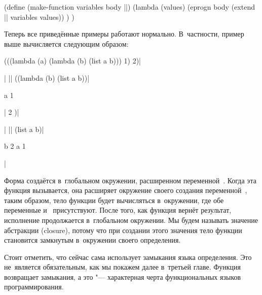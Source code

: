 \begin{code:lisp}[label=basics/representing-functions/fixing/src:inject-current-env]
(define (make-function variables body ||)
  (lambda (values)
    (eprogn body (extend || variables values)) ) )
\end{code:lisp}

Теперь все приведённые примеры работают нормально. В~частности, пример выше
вычисляется следующим образом:

\begin{code:lisp}
(((lambda (a) (lambda (b) (list a b))) 1) 2)|\begin{where}
                                             \- 
                                             \end{where}|
|\equals| ((lambda (b) (list a b))|\begin{where}
                                   \- a {\is} 1
                                   \- 
                                   \end{where}|
    2 )|\begin{where}
        \- 
        \end{where}|
|\equals| (list a b)|\begin{where}
                     \- b {\is} 2
                     \- a {\is} 1
                     \- 
                     \end{where}|
\end{code:lisp}

Форма  создаётся в~глобальном окружении, расширенном
переменной~. Когда эта функция вызывается, она расширяет окружение своего 
создания переменной~, таким образом, тело функции будет вычисляться
в~окружении, где обе переменные  и~ присутствуют. После того, как
функция вернёт результат, исполнение продолжается в~глобальном окружении. Мы
будем называть значение абстракции  (closure), потому что при
создании этого значения тело функции становится замкнутым в~окружении своего
определения.

Стоит отметить, что сейчас  сама использует замыкания языка
определения. Это не~является обязательным, как мы покажем далее в~третьей главе.
 Функция~ возвращает
замыкания, а это "--- характерная черта функциональных языков программирования.


